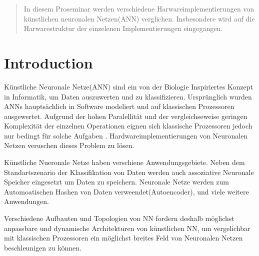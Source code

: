 \documentclass[conference]{IEEEtran}
\begin{document}
    \maketitle

    \begin{abstract}
        In diesem Proseminar werden verschiedene Harwareimplementierungen von künstlichen neuronalen Netzen(ANN) verglichen.
        Insbesondere wird auf die Harwarestruktur der einzelenen Implementierungen eingegangen.

    \end{abstract}





    \IEEEpeerreviewmaketitle



    \section{Introduction}

    Künstliche Neuronale Netze(ANN) sind ein von der Biologie Inspiriertes Konzept in Informatik, um Daten auszuwerten und zu klassifizieren.
    Ursprünglich wurden ANNs hauptsächlich in Software modeliert und auf klassischen Prozessoren ausgewertet. Aufgrund der hohen Paralellität und der vergleichseweise geringen Komplexität der einzelnen Operationen eignen sich klassische Prozessoren jedoch nur bedingt für solche Aufgaben \cite{forssell2014hardware}.
    Hardwareimplementierungen von Neuronalen Netzen veruschen dieses Problem zu lösen.

    Künstliche Nueronale Netze haben verschiene Anwendungsgebiete.
    Neben dem Standartszenario der Klassifikation von Daten werden auch assoziative Neuronale Speicher eingesetzt um Daten zu speichern.
    Neuronale Netze werden zum Automoatischen Hashen von Daten verweendet(Autoencoder), und viele weitere Anwendungen.


    Verschiedene Aufbauten und Topologien von NN fordern deshalb möglichst anpassbare und dynamische Architekturen von künstlichen NN,
    um vergelichbar mit klassischen Prozessoren ein möglichst breites Feld von Neuronalen Netzen beschleunigen zu können.
\end{document}
